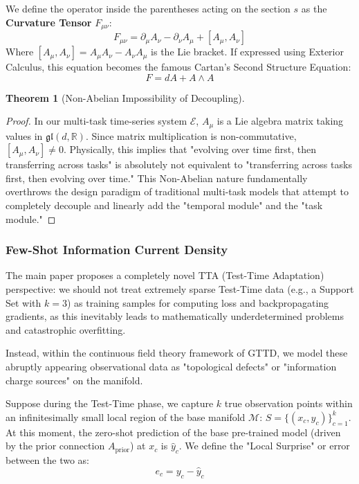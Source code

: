 \documentclass{article}
\newtheorem{theorem}{Theorem}[section]
\begin{document}
We define the operator inside the parentheses acting on the section $s$ as the \textbf{Curvature Tensor} $F_{\mu\nu}$:
\begin{equation}
F_{\mu\nu} = \partial_\mu A_\nu - \partial_\nu A_\mu + [A_\mu, A_\nu]
\end{equation}
Where $[A_\mu, A_\nu] = A_\mu A_\nu - A_\nu A_\mu$ is the Lie bracket. If expressed using Exterior Calculus, this equation becomes the famous Cartan's Second Structure Equation:
\begin{equation}
F = dA + A \wedge A
\end{equation}

\begin{theorem}[Non-Abelian Impossibility of Decoupling]
\hfill
\end{theorem}

\begin{proof}
In our multi-task time-series system $\mathcal{E}$, $A_\mu$ is a Lie algebra matrix taking values in $\mathfrak{gl}(d, \mathbb{R})$. Since matrix multiplication is non-commutative, $[A_\mu, A_\nu] \neq 0$. Physically, this implies that "evolving over time first, then transferring across tasks" is absolutely not equivalent to "transferring across tasks first, then evolving over time." This Non-Abelian nature fundamentally overthrows the design paradigm of traditional multi-task models that attempt to completely decouple and linearly add the "temporal module" and the "task module."
\end{proof}

\subsubsection{Few-Shot Information Current Density}

The main paper proposes a completely novel TTA (Test-Time Adaptation) perspective: we should not treat extremely sparse Test-Time data (e.g., a Support Set with $k=3$) as training samples for computing loss and backpropagating gradients, as this inevitably leads to mathematically underdetermined problems and catastrophic overfitting.

Instead, within the continuous field theory framework of GTTD, we model these abruptly appearing observational data as "topological defects" or "information charge sources" on the manifold.

Suppose during the Test-Time phase, we capture $k$ true observation points within an infinitesimally small local region of the base manifold $\mathcal{M}$: $S = \{(x_c, y_c)\}_{c=1}^k$. At this moment, the zero-shot prediction of the base pre-trained model (driven by the prior connection $A_{\text{prior}}$) at $x_c$ is $\hat{y}_c$. We define the "Local Surprise" or error between the two as:
\begin{equation}
e_c = y_c - \hat{y}_c
\end{equation}
\end{document}
